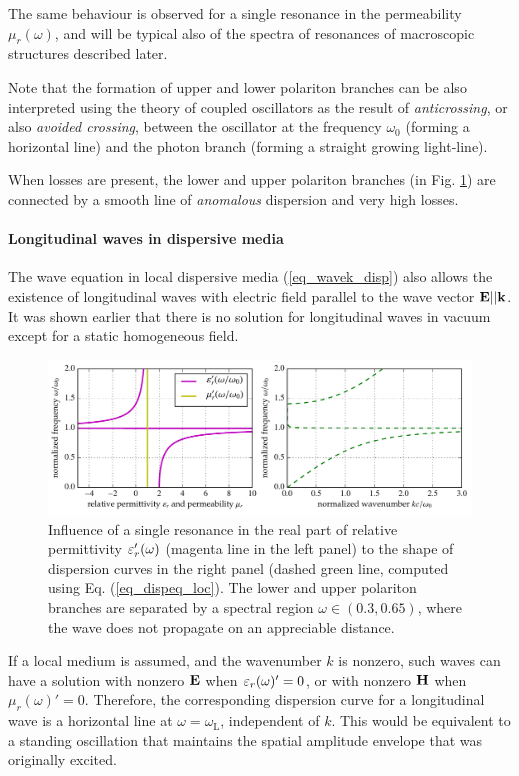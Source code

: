 The same behaviour is observed for a single resonance in the permeability $\mu_r(\omega)$, and will be typical also of the spectra of resonances of macroscopic structures described later.

Note that the formation of upper and lower polariton branches can be also interpreted \cite{landau1984electrodynamics} using the theory of coupled oscillators as the result of \textit{anticrossing}, or also \textit{avoided crossing}, between the oscillator at the frequency $\omega_0$ (forming a horizontal line) and the photon branch (forming a straight growing light-line). \label{anticrossing}

When losses are present, the lower and upper polariton branches (in Fig. \ref{fg_dcsimpleel}) are connected by a smooth line of \textit{anomalous} dispersion and very high losses.  

\paragraph{Longitudinal waves in dispersive media} %
The wave equation in local dispersive media (\ref{eq_wavek_disp}) 
also allows the existence of longitudinal waves with electric field parallel to the wave vector $\mathbf{E} || {\mathbf{k}}$. It was shown earlier that there is no solution for longitudinal waves in vacuum except for a static homogeneous field.

\begin{figure}[t] \caption{Influence of a single resonance in the real part of relative permittivity $\varepsilon_r'(\omega)$ (magenta line in the left panel) to the shape of dispersion curves in the right panel (dashed green line, computed using Eq. (\ref{eq_dispeq_loc}). The lower and upper polariton branches are separated by a spectral region $\omega \in (0.3, 0.65)$, where the wave does not propagate on an appreciable distance.} \label{fg_dcsimpleel} \centering 
	\includegraphics[width=\textwidth]{img/dispersion_landau_lifshitz/dispersion_simple_el.pdf}
\end{figure}
If a local medium is assumed, and the wavenumber $k$ is nonzero, such waves can have a solution with nonzero $\mathbf{E}$ when $\varepsilon_r(\omega)' = 0$, or with nonzero $\mathbf{H}$ when $\mu_r(\omega)' = 0$. Therefore, the corresponding dispersion curve for a longitudinal wave is a horizontal line at $\omega = \omega_{\text{L}}$, independent of $k$. This would be equivalent to a standing oscillation that maintains the spatial amplitude envelope that was originally excited. 

